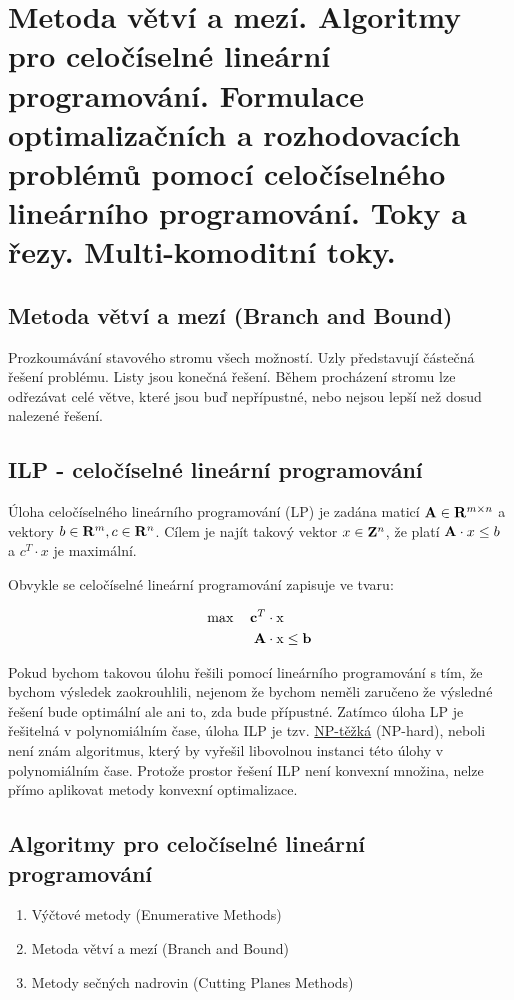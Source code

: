 \section[KO - ILP, toky]{Metoda větví a mezí. Algoritmy pro celočíselné lineární programování. Formulace optimalizačních a rozhodovacích problémů pomocí celočíselného lineárního programování. Toky a řezy. Multi-komoditní toky.}

\subsection{Metoda větví a mezí (Branch and Bound)}
Prozkoumávání stavového stromu všech možností. Uzly představují částečná řešení problému. Listy jsou konečná řešení. Během procházení stromu lze odřezávat celé větve, které jsou buď nepřípustné, nebo nejsou lepší než dosud nalezené řešení.

\subsection{ILP - celočíselné lineární programování}

Úloha celočíselného lineárního programování (LP) je zadána maticí ${\bf A} \in {\bf R}^{m \times n}$ a vektory $b \in {\bf R}^m, c \in {\bf R}^n$. Cílem je najít takový vektor $x \in {\bf Z}^n$, že platí ${\bf A} \cdot x \leq b$ a $c^T \cdot x$ je maximální.

Obvykle se celočíselné lineární programování zapisuje ve tvaru:

	
\begin{align*} 
\max \quad {\bf c}^T \cdot \text{x} &\\
\qquad {\bf A} \cdot \text{x} & \leq {\bf b}
\end{align*}
	
Pokud bychom takovou úlohu řešili pomocí lineárního programování s tím, že bychom výsledek zaokrouhlili, nejenom že bychom neměli zaručeno že výsledné řešení bude optimální ale ani to, zda bude přípustné. 
Zatímco úloha LP je řešitelná v polynomiálním čase, úloha ILP je tzv. \hyperref[heading:npc]{NP-těžká} (NP-hard), neboli není znám algoritmus, který by vyřešil libovolnou instanci této úlohy v polynomiálním čase. Protože prostor řešení ILP není konvexní množina, nelze přímo aplikovat metody konvexní optimalizace.

\subsection{Algoritmy pro celočíselné lineární programování}
\begin{enumerate}
	\item Výčtové metody (Enumerative Methods)
	\item Metoda větví a mezí (Branch and Bound)
	\item Metody sečných nadrovin (Cutting Planes Methods)
\end{enumerate}

